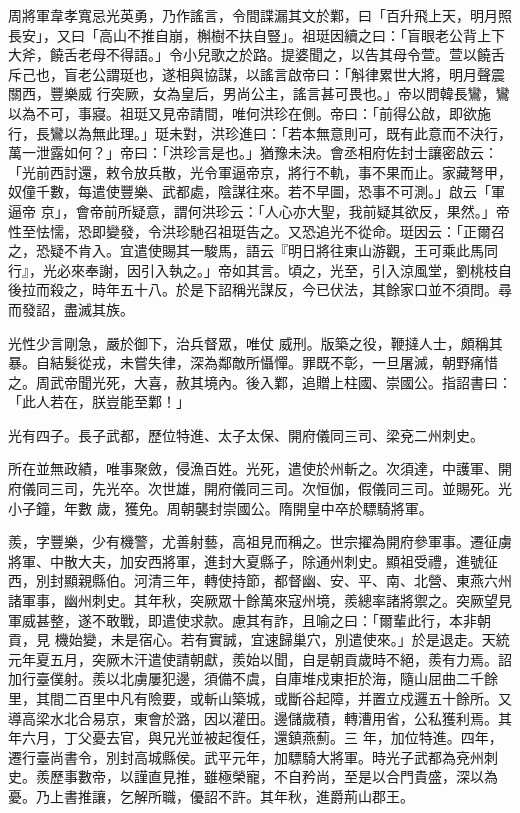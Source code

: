 \begin{pinyinscope}
 周將軍韋孝寬忌光英勇，乃作謠言，令間諜漏其文於鄴，曰「百升飛上天，明月照長安」，又曰「高山不推自崩，槲樹不扶自豎」。祖珽因續之曰：「盲眼老公背上下大斧，饒舌老母不得語。」令小兒歌之於路。提婆聞之，以告其母令萱。萱以饒舌斥己也，盲老公謂珽也，遂相與協謀，以謠言啟帝曰：「斛律累世大將，明月聲震關西，豐樂威
 行突厥，女為皇后，男尚公主，謠言甚可畏也。」帝以問韓長鸞，鸞以為不可，事寢。祖珽又見帝請間，唯何洪珍在側。帝曰：「前得公啟，即欲施行，長鸞以為無此理。」珽未對，洪珍進曰：「若本無意則可，既有此意而不決行，萬一泄露如何？」帝曰：「洪珍言是也。」猶豫未決。會丞相府佐封士讓密啟云：「光前西討還，敕令放兵散，光令軍逼帝京，將行不軌，事不果而止。家藏弩甲，奴僮千數，每遣使豐樂、武都處，陰謀往來。若不早圖，恐事不可測。」啟云「軍逼帝
 京」，會帝前所疑意，謂何洪珍云：「人心亦大聖，我前疑其欲反，果然。」帝性至怯懦，恐即變發，令洪珍馳召祖珽告之。又恐追光不從命。珽因云：「正爾召之，恐疑不肯入。宜遣使賜其一駿馬，語云『明日將往東山游觀，王可乘此馬同行』，光必來奉謝，因引入執之。」帝如其言。頃之，光至，引入涼風堂，劉桃枝自後拉而殺之，時年五十八。於是下詔稱光謀反，今已伏法，其餘家口並不須問。尋而發詔，盡滅其族。



 光性少言剛急，嚴於御下，治兵督眾，唯仗
 威刑。版築之役，鞭撻人士，頗稱其暴。自結髮從戎，未嘗失律，深為鄰敵所懾憚。罪既不彰，一旦屠滅，朝野痛惜之。周武帝聞光死，大喜，赦其境內。後入鄴，追贈上柱國、崇國公。指詔書曰：「此人若在，朕豈能至鄴！」



 光有四子。長子武都，歷位特進、太子太保、開府儀同三司、梁兗二州刺史。



 所在並無政績，唯事聚斂，侵漁百姓。光死，遣使於州斬之。次須達，中護軍、開府儀同三司，先光卒。次世雄，開府儀同三司。次恒伽，假儀同三司。並賜死。光小子鐘，年數
 歲，獲免。周朝襲封崇國公。隋開皇中卒於驃騎將軍。



 羨，字豐樂，少有機警，尤善射藝，高祖見而稱之。世宗擢為開府參軍事。遷征虜將軍、中散大夫，加安西將軍，進封大夏縣子，除通州刺史。顯祖受禮，進號征西，別封顯親縣伯。河清三年，轉使持節，都督幽、安、平、南、北營、東燕六州諸軍事，幽州刺史。其年秋，突厥眾十餘萬來寇州境，羨總率諸將禦之。突厥望見軍威甚整，遂不敢戰，即遣使求款。慮其有詐，且喻之曰：「爾輩此行，本非朝貢，見
 機始變，未是宿心。若有實誠，宜速歸巢穴，別遣使來。」於是退走。天統元年夏五月，突厥木汗遣使請朝獻，羨始以聞，自是朝貢歲時不絕，羨有力焉。詔加行臺僕射。羨以北虜屢犯邊，須備不虞，自庫堆戍東拒於海，隨山屈曲二千餘里，其間二百里中凡有險要，或斬山築城，或斷谷起障，并置立戍邏五十餘所。又導高梁水北合易京，東會於潞，因以灌田。邊儲歲積，轉漕用省，公私獲利焉。其年六月，丁父憂去官，與兄光並被起復任，還鎮燕薊。三
 年，加位特進。四年，遷行臺尚書令，別封高城縣侯。武平元年，加驃騎大將軍。時光子武都為兗州刺史。羨歷事數帝，以謹直見推，雖極榮寵，不自矜尚，至是以合門貴盛，深以為憂。乃上書推讓，乞解所職，優詔不許。其年秋，進爵荊山郡王。




\end{pinyinscope}
